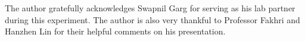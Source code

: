 \documentclass[aps,twocolumn,secnumarabic,balancelastpage,amsmath,amssymb,nofootinbib, floatfix]{revtex4-2}
\begin{document}
\begin{acknowledgments} The author gratefully acknowledges Swapnil Garg for serving as his lab partner during this experiment. The author is also very thankful to Professor Fakhri and Hanzhen Lin for their helpful comments on his presentation. 
\end{acknowledgments}



\end{document}
